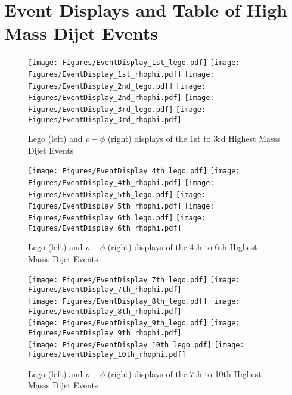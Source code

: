 \section{Event Displays and Table of High Mass Dijet Events}
\label{appEvents}

\begin{figure}[!ht]
  \begin{center}
    \texttt{[image: Figures/EventDisplay\_1st\_lego.pdf]}
    \texttt{[image: Figures/EventDisplay\_1st\_rhophi.pdf]}
    \texttt{[image: Figures/EventDisplay\_2nd\_lego.pdf]}
    \texttt{[image: Figures/EventDisplay\_2nd\_rhophi.pdf]}
    \texttt{[image: Figures/EventDisplay\_3rd\_lego.pdf]}
    \texttt{[image: Figures/EventDisplay\_3rd\_rhophi.pdf]}
    \caption{Lego (left) and $\rho-\phi$ (right) displays of the 1st to 3rd Highest Masss Dijet Events}
    \label{MultiEventDisplay1}
  \end{center}
\end{figure}

\begin{figure}[!ht]
  \begin{center}
    \texttt{[image: Figures/EventDisplay\_4th\_lego.pdf]}
    \texttt{[image: Figures/EventDisplay\_4th\_rhophi.pdf]}
    \texttt{[image: Figures/EventDisplay\_5th\_lego.pdf]}
    \texttt{[image: Figures/EventDisplay\_5th\_rhophi.pdf]}
    \texttt{[image: Figures/EventDisplay\_6th\_lego.pdf]}
    \texttt{[image: Figures/EventDisplay\_6th\_rhophi.pdf]}
    \caption{Lego (left) and $\rho-\phi$ (right) displays of the 4th to 6th Highest Masss Dijet Events}
    \label{MultiEventDisplay2}
  \end{center}
\end{figure}

\begin{figure}[!ht]
  \begin{center}
    \texttt{[image: Figures/EventDisplay\_7th\_lego.pdf]}
    \texttt{[image: Figures/EventDisplay\_7th\_rhophi.pdf]} \\
    \texttt{[image: Figures/EventDisplay\_8th\_lego.pdf]}
    \texttt{[image: Figures/EventDisplay\_8th\_rhophi.pdf]} \\
    \texttt{[image: Figures/EventDisplay\_9th\_lego.pdf]}
    \texttt{[image: Figures/EventDisplay\_9th\_rhophi.pdf]} \\
    \texttt{[image: Figures/EventDisplay\_10th\_lego.pdf]}
    \texttt{[image: Figures/EventDisplay\_10th\_rhophi.pdf]}
    \caption{Lego (left) and $\rho-\phi$ (right) displays of the 7th to 10th Highest Masss Dijet Events}
    \label{MultiEventDisplay3}
  \end{center}
\end{figure}

